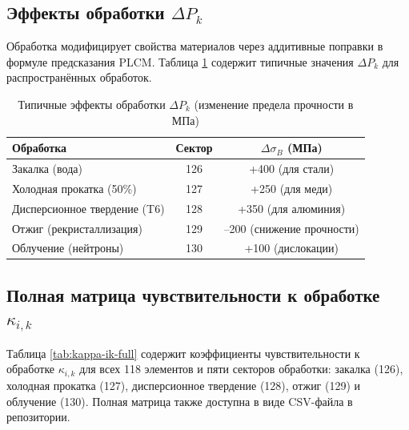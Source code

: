 \documentclass[12pt,a4paper]{article}
\begin{document}
	\subsection{Эффекты обработки \(\Delta P_k\)}
	\label{sec:processing}
	
	Обработка модифицирует свойства материалов через аддитивные поправки в формуле предсказания PLCM. Таблица \ref{tab:processing-effects} содержит типичные значения \(\Delta P_k\) для распространённых обработок.
	
	\begin{table}[htbp]
		\centering
		\caption{Типичные эффекты обработки \(\Delta P_k\) (изменение предела прочности в МПа)}
		\label{tab:processing-effects}
		\begin{tabular}{lcc}
			\toprule
			Обработка & Сектор & \(\Delta \sigma_B\) (МПа) \\
			\midrule
			Закалка (вода) & 126 & +400 (для стали) \\
			Холодная прокатка (50\%) & 127 & +250 (для меди) \\
			Дисперсионное твердение (T6) & 128 & +350 (для алюминия) \\
			Отжиг (рекристаллизация) & 129 & –200 (снижение прочности) \\
			Облучение (нейтроны) & 130 & +100 (дислокации) \\
			\bottomrule
		\end{tabular}
	\end{table}
	
	\subsection{Полная матрица чувствительности к обработке \(\kappa_{i,k}\)}
	\label{subsec:full-kappa-ik}
	
	Таблица \ref{tab:kappa-ik-full} содержит коэффициенты чувствительности к обработке \(\kappa_{i,k}\) для всех 118 элементов и пяти секторов обработки: закалка (126), холодная прокатка (127), дисперсионное твердение (128), отжиг (129) и облучение (130). Полная матрица также доступна в виде CSV-файла в репозитории.
	
\end{document}

